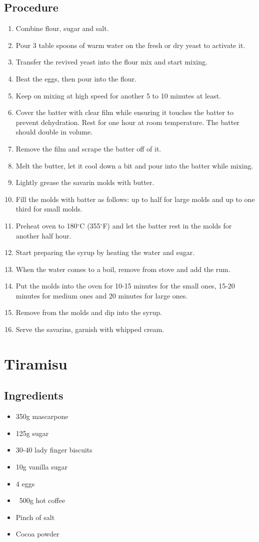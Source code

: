 \documentclass[10pt]{book}
\newcommand{\degree}{$^\circ$}
\begin{document}
\subsection*{Procedure}
	\begin{enumerate}
		\item Combine flour, sugar and salt.
		\item Pour 3 table spoons of warm water on the fresh or dry yeast to activate it.
		\item Transfer the revived yeast into the flour mix and start mixing.
		\item Beat the eggs, then pour into the flour.
		\item Keep on mixing at high speed for another 5 to 10 minutes at least.
		\item Cover the batter with clear film while ensuring it touches the batter to prevent dehydration. Rest for one hour at room temperature. The batter should double in volume.
		\item Remove the film and scrape the batter off of it.
		\item Melt the butter, let it cool down a bit and pour into the batter while mixing.
		\item Lightly grease the savarin molds with butter.
		\item Fill the molds with batter as follows: up to half for large molds and up to one third for small molds.
		\item Preheat oven to 180{\degree}C (355{\degree}F) and let the batter rest in the molds for another half hour.
		\item Start preparing the syrup by heating the water and sugar.
		\item When the water comes to a boil, remove from stove and add the rum.
		\item Put the molds into the oven for 10-15 minutes for the small ones, 15-20 minutes for medium ones and 20 minutes for large ones.
		\item Remove from the molds and dip into the syrup.
		\item Serve the savarins, garnish with whipped cream.
	\end{enumerate}
\newpage


\newpage
\section*{Tiramisu}
\subsection*{Ingredients}
	\begin{itemize}
		\item 350g mascarpone
		\item 125g sugar
		\item 30-40 lady finger biscuits
		\item 10g vanilla sugar
		\item 4 eggs
		\item ~500g hot coffee
		\item Pinch of salt
		\item Cocoa powder
	\end{itemize}
\end{document}
